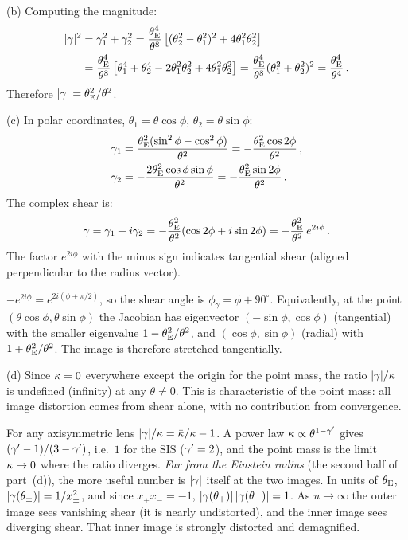 (b) Computing the magnitude:
\begin{align*}
    |\gamma|^2 &= \gamma_1^2 + \gamma_2^2
    = \frac{\theta_{\mathrm{E}}^4}{\theta^8}\left[
    (\theta_2^2 - \theta_1^2)^2 + 4\theta_1^2\theta_2^2\right] \\
    &= \frac{\theta_{\mathrm{E}}^4}{\theta^8}\left[
    \theta_1^4 + \theta_2^4 - 2\theta_1^2\theta_2^2
    + 4\theta_1^2\theta_2^2\right]
    = \frac{\theta_{\mathrm{E}}^4}{\theta^8}(\theta_1^2 + \theta_2^2)^2
    = \frac{\theta_{\mathrm{E}}^4}{\theta^4} \,.
\end{align*}
Therefore $|\gamma| = \theta_{\mathrm{E}}^2/\theta^2$. \checkmark

(c) In polar coordinates, $\theta_1 = \theta\cos\phi$,
$\theta_2 = \theta\sin\phi$:
\begin{align*}
    \gamma_1 &= \frac{\theta_{\mathrm{E}}^2(\sin^2\phi - \cos^2\phi)}{\theta^2}
    = -\frac{\theta_{\mathrm{E}}^2\cos 2\phi}{\theta^2} \,, \\
    \gamma_2 &= -\frac{2\theta_{\mathrm{E}}^2\cos\phi\sin\phi}{\theta^2}
    = -\frac{\theta_{\mathrm{E}}^2\sin 2\phi}{\theta^2} \,.
\end{align*}
The complex shear is:
\begin{equation*}
    \gamma = \gamma_1 + i\gamma_2
    = -\frac{\theta_{\mathrm{E}}^2}{\theta^2}(\cos 2\phi + i\sin 2\phi)
    = -\frac{\theta_{\mathrm{E}}^2}{\theta^2}\,e^{2i\phi} \,.
\end{equation*}
The factor $e^{2i\phi}$ with the minus sign indicates tangential
shear (aligned perpendicular to the radius vector). \checkmark
\begin{annotation}
$-e^{2i\phi} = e^{2i(\phi + \pi/2)}$, so the shear angle is
$\phi_\gamma = \phi + 90^\circ$. Equivalently, at the point
$(\theta\cos\phi, \theta\sin\phi)$ the Jacobian has eigenvector
$(-\sin\phi, \cos\phi)$ (tangential) with the smaller eigenvalue
$1 - \theta_{\mathrm{E}}^2/\theta^2$, and $(\cos\phi, \sin\phi)$ (radial) with
$1 + \theta_{\mathrm{E}}^2/\theta^2$. The image is therefore stretched tangentially.
\end{annotation}

(d) Since $\kappa = 0$ everywhere except the origin for the
point mass, the ratio $|\gamma|/\kappa$ is undefined (infinity) at
any $\theta \neq 0$.  This is characteristic of the point mass: all
image distortion comes from shear alone, with no contribution from
convergence.
\begin{annotation}
For any axisymmetric lens $|\gamma|/\kappa = \bar{\kappa}/\kappa - 1$. A
power law $\kappa \propto \theta^{1-\gamma'}$ gives $(\gamma' - 1)/(3 - \gamma')$, i.e.\
$1$ for the SIS ($\gamma' = 2$), and the point mass is the limit $\kappa \to 0$
where the ratio diverges. \emph{Far from the Einstein radius} (the second
half of part~(d)), the more useful number is $|\gamma|$ itself at the two
images. In units of $\theta_{\mathrm{E}}$, $|\gamma(\theta_\pm)| = 1/x_\pm^2$, and since
$x_+x_- = -1$, $|\gamma(\theta_+)|\,|\gamma(\theta_-)| = 1$. As $u \to \infty$
the outer image sees vanishing shear (it is nearly undistorted), and the
inner image sees diverging shear. That inner image is strongly distorted and
demagnified.
\end{annotation}

